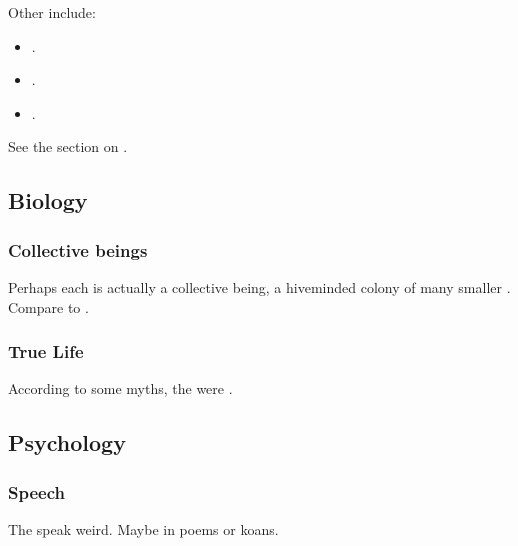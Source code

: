 Other \xss{} include:

\begin{itemize}
  \item {}. 
  \item {}.
  \item {}. 
\end{itemize}

See the section on . 










\subsection{Biology}





\subsubsection{Collective beings}
Perhaps each \xs{} is actually a collective being, a hiveminded colony of many smaller \daemons. 
Compare to . 





\subsubsection{True Life}
According to some myths, the \xss were .









\subsection{Psychology}





\subsubsection{Speech}
The \xss{} speak weird. 
Maybe in poems or koans. 

